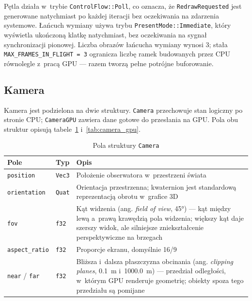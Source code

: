 Pętla działa w~trybie \texttt{ControlFlow::Poll}, co oznacza, że
\texttt{RedrawRequested} jest generowane natychmiast po każdej iteracji bez
oczekiwania na zdarzenia systemowe. Łańcuch wymiany używa trybu \texttt{PresentMode::Immediate}, który wyświetla
ukończoną klatkę natychmiast, bez oczekiwania na sygnał synchronizacji
pionowej. Liczba obrazów łańcucha wymiany wynosi 3; stała
\texttt{MAX\_FRAMES\_IN\_FLIGHT = 3} ogranicza liczbę ramek budowanych
przez CPU równolegle z~pracą GPU --- razem tworzą pełne potrójne buforowanie.

\subsection{Kamera}
\label{subsec:camera}

Kamera jest podzielona na dwie struktury. \texttt{Camera} przechowuje stan
logiczny po stronie CPU; \texttt{CameraGPU} zawiera dane gotowe
do przesłania na GPU. Pola obu struktur opisują
tabele~\ref{tab:camera_cpu} i~\ref{tab:camera_gpu}.

\begin{table}[htbp]
\centering
\caption{Pola struktury \texttt{Camera}}
\label{tab:camera_cpu}
\begin{tabular}{llp{7cm}}
\toprule
\textbf{Pole} & \textbf{Typ} & \textbf{Opis} \\
\midrule
\texttt{position}     & \texttt{Vec3}  & Położenie obserwatora w~przestrzeni świata \\[3pt]
\texttt{orientation}  & \texttt{Quat}  & Orientacja przestrzenna; kwaternion jest standardową reprezentacją obrotu w~grafice 3D \\[3pt]
\texttt{fov}          & \texttt{f32}   & Kąt widzenia (ang. \textit{field of view}, 45°) --- kąt między lewą a~prawą krawędzią pola widzenia; większy kąt daje szerszy widok, ale silniejsze zniekształcenie perspektywiczne na brzegach \\[3pt]
\texttt{aspect\_ratio}& \texttt{f32}   & Proporcje ekranu, domyślnie 16/9 \\[3pt]
\texttt{near} / \texttt{far} & \texttt{f32} & Bliższa i~dalsza płaszczyzna obcinania (ang. \textit{clipping planes}, 0.1~m i~1000.0~m) --- przedział odległości, w~którym GPU renderuje geometrię; obiekty spoza tego przedziału są pomijane \\
\bottomrule
\end{tabular}
\end{table}

